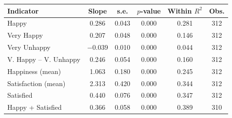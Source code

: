 \begin{tabular}{lccccc}
\toprule
Indicator & Slope & s.e. & $p$-value & Within $R^2$ & Obs. \\
\midrule
Happy & 0.286 & 0.043 & 0.000 & 0.281 & 312 \\
Very Happy & 0.207 & 0.048 & 0.000 & 0.146 & 312 \\
Very Unhappy & \ensuremath{-}0.039 & 0.010 & 0.000 & 0.044 & 312 \\
V. Happy -- V. Unhappy & 0.246 & 0.054 & 0.000 & 0.160 & 312 \\
Happiness (mean) & 1.063 & 0.180 & 0.000 & 0.245 & 312 \\
Satisfaction (mean) & 2.313 & 0.420 & 0.000 & 0.344 & 312 \\
Satisfied & 0.440 & 0.076 & 0.000 & 0.347 & 312 \\
Happy + Satisfied & 0.366 & 0.058 & 0.000 & 0.389 & 310 \\
\bottomrule
\end{tabular}
